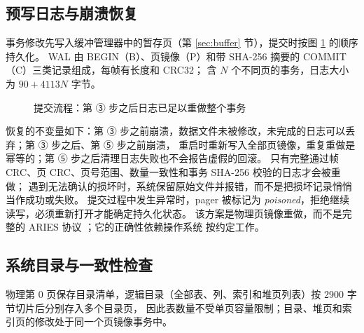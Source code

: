 \documentclass[a4paper,zihao=-4,UTF8,fontset=windows,linespread=1.35]{ctexart}
\newcommand{\fn}[1]{\texttt{\detokenize{#1}}}
\begin{document}
\subsection{预写日志与崩溃恢复}
事务修改先写入缓冲管理器中的暂存页（第 \ref{sec:buffer} 节），提交时按图 \ref{fig:commit} 的顺序持久化。
WAL 由 BEGIN（B）、页镜像（P）和带 SHA-256 摘要的 COMMIT（C）三类记录组成，每帧有长度和 CRC32；
含 $N$ 个不同页的事务，日志大小为 $90 + 4113N$ 字节。

\begin{figure}[!htb]
\centering
{}
\caption{提交流程：第 ③ 步之后日志已足以重做整个事务}\label{fig:commit}
\end{figure}

恢复的不变量如下：第 ③ 步之前崩溃，数据文件未被修改，未完成的日志可以丢弃；第 ③ 步之后、第 ⑤ 步之前崩溃，
重启时重新写入全部页镜像，重复重做是幂等的；第 ⑤ 步之后清理日志失败也不会报告虚假的回滚。
只有完整通过帧 CRC、页 CRC、页号范围、数量一致性和事务 SHA-256 校验的日志才会被重做；
遇到无法确认的损坏时，系统保留原始文件并报错，而不是把损坏记录悄悄当作成功或失败。
提交过程中发生异常时，pager 被标记为 \emph{poisoned}，拒绝继续读写，必须重新打开才能确定持久化状态。
该方案是物理页镜像重做，而不是完整的 ARIES 协议 \cite{mohan1992}；它的正确性依赖操作系统 \fn{fsync} 按约定工作。

\subsection{系统目录与一致性检查}
物理第 0 页保存目录清单，逻辑目录（全部表、列、索引和堆页列表）按 2900 字节切片后分别存入多个目录页，
因此表数量不受单页容量限制；目录、堆页和索引页的修改处于同一个页镜像事务中。
\end{document}
